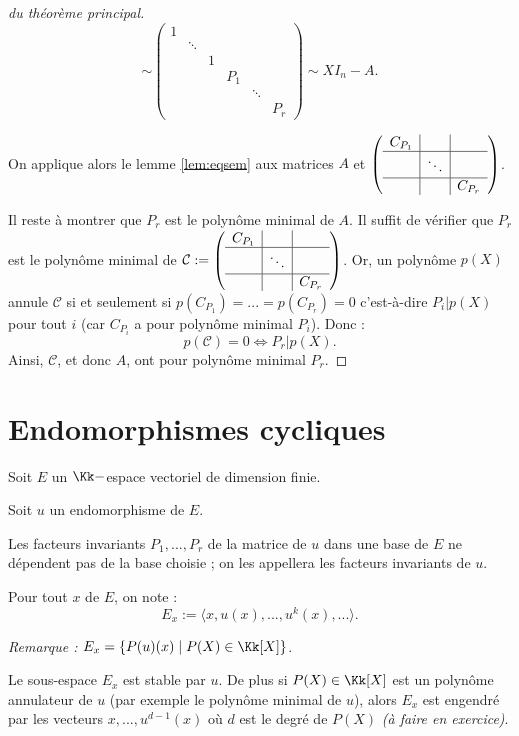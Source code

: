 \documentclass[class=report,crop=false]{standalone}
\newcommand{\exoo}{\emph{(à faire en exercice)}}
\begin{document}
\begin{proof}[du théorème principal]
\[\sim \left(\begin{array}{cccccc}
1 &&&&&\\
& \ddots&&&&\\
&&1&&&\\
&&&P_1&&\\
&&&&\ddots&\\
&&&&&P_r
\end{array}
\right) \sim XI_n-A .\]

On applique alors le lemme \ref{lem:eqsem} aux matrices $A$ et $\left(\begin{array}{c|c|c}
C_{P_1}&&\\\hline
&\ddots&\\\hline
&&C_{P_r}
\end{array}\right)$. 

Il reste à montrer que $P_r$ est le polynôme minimal de $A$. Il suffit de vérifier que $P_r$ est le polynôme minimal de $\mathcal{C} := \left(\begin{array}{c|c|c}
C_{P_1}&&\\\hline
&\ddots&\\\hline
&&C_{P_r}
\end{array}\right)$. Or, un polynôme $p(X)$ annule $\mathcal{C}$ si et seulement si $p(C_{P_1})=...=p(C_{P_r}) =0$ c'est-à-dire $P_i | p(X)$ pour tout $i$ (car $C_{P_i}$ a pour polynôme minimal $P_i$). Donc :
\[p(\mathcal{C}) =0 \iff P_r | p(X).\]
Ainsi, $\mathcal{C}$, et donc $A$, ont pour polynôme minimal $P_r$. 
\end{proof}


\section{Endomorphismes cycliques}
Soit $E$ un $\Kk-$espace vectoriel de dimension finie.


Soit $u$ un endomorphisme de $E$. 

Les facteurs invariants $P_1,...,P_r$ de la matrice de $u$ dans une base de $E$ ne dépendent pas de la base choisie ; on les appellera les facteurs invariants de $u$.

Pour tout $x$ de $E$, on note :
\[E_x:=\langle x, u(x),...,u^k(x),...\rangle .\]

{\it Remarque : } $E_x = \{P(u)(x) \mid P(X) \in \Kk[X]\}$. 

Le sous-espace $E_x$ est stable par $u$. De plus si $P(X) \in \Kk[X]$ est un polynôme annulateur de $u$ (par exemple le polynôme minimal de $u$), alors $E_x$ est engendré par les vecteurs $x, ...,u^{d-1}(x)$ où $d$ est le degré de $P(X)$ \exoo . 
\end{document}

